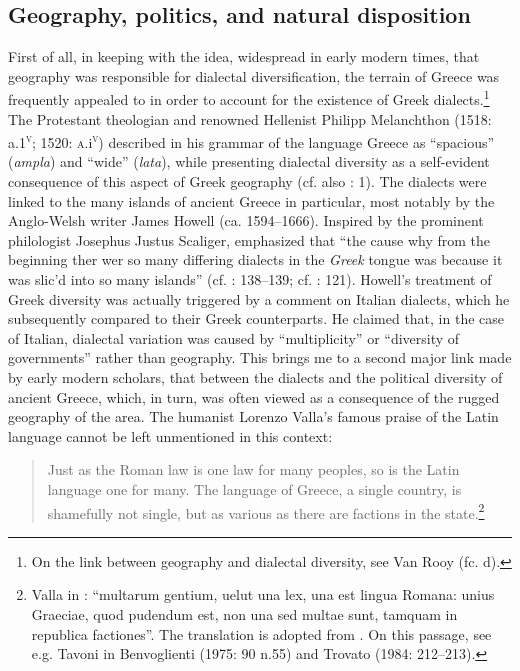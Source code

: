 \subsection{Geography, politics, and natural disposition}
\hypertarget{Toc19704854}{}
First of all, in keeping with the idea, widespread in early modern times, that geography was responsible for dialectal diversification, the terrain of Greece was frequently appealed to in order to account for the existence of Greek dialects.\footnote{On the link between geography and dialectal diversity, see Van Rooy (fc. d).} The Protestant theologian and renowned Hellenist Philipp Melanchthon (1518: a.1\textsc{\textsuperscript{v}}; 1520: \textsc{a.}i\textsc{\textsuperscript{v}}) described in his grammar of the language Greece as “spacious” (\textit{ampla}) and “wide” (\textit{lata}), while presenting dialectal diversity as a self-evident consequence of this aspect of Greek geography (cf. also \citealt{Ruland1556}: 1). The dialects were linked to the many islands of ancient Greece in particular, most notably by the Anglo-Welsh writer James Howell (ca. 1594–1666). Inspired by the prominent philologist Josephus Justus Scaliger, \citet[89]{Howell1650b} emphasized that “the cause why from the beginning ther wer so many differing dialects in the \textit{Greek} tongue was because it was slic’d into so many islands” (cf. \citealt{Howell1642}: 138–139; cf. \citealt{Scaliger1610}: 121). Howell’s treatment of Greek diversity was actually triggered by a comment on Italian dialects, which he subsequently compared to their Greek counterparts. He claimed that, in the case of Italian, dialectal variation was caused by “multiplicity” or “diversity of governments” rather than geography. This brings me to a second major link made by early modern scholars, that between the dialects and the political diversity of ancient Greece, which, in turn, was often viewed as a consequence of the rugged geography of the area. The humanist Lorenzo Valla’s famous praise of the Latin language cannot be left unmentioned in this context:

\begin{quote}
Just as the Roman law is one law for many peoples, so is the Latin language one for many. The language of Greece, a single country, is shamefully not single, but as various as there are factions in the state.\footnote{Valla in \citet[122]{Regoliosi1993}: “multarum gentium, uelut una lex, una est lingua Romana: unius Graeciae, quod pudendum est, non una sed multae sunt, tamquam in republica factiones”. The translation is adopted from \citet[10]{Trapp1990}. On this passage, see e.g. Tavoni in Benvoglienti (1975: 90 n.55) and Trovato (1984: 212–213).}
\end{quote}

